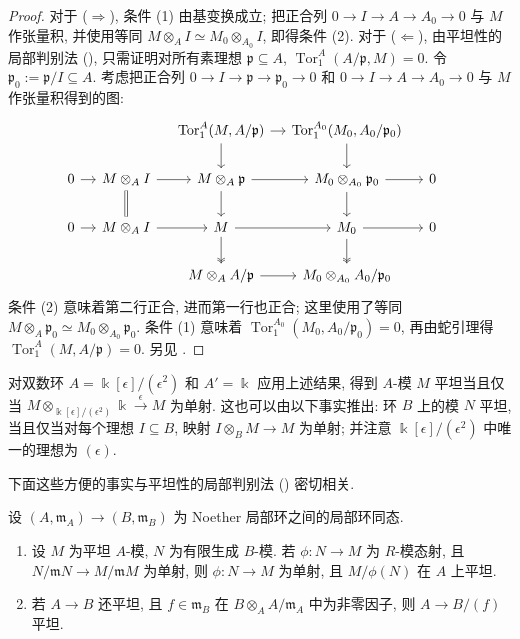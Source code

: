 \begin{proof}
对于 ($\Rightarrow$), 条件 (1) 由基变换成立; 把正合列 $0\to I\to A\to A_0\to0$ 与 $M$ 作张量积, 并使用等同 $M\otimes_A I\simeq M_0\otimes_{A_0}I$, 即得条件 (2). 对于 ($\Leftarrow$), 由平坦性的局部判别法 (), 只需证明对所有素理想 $\mathfrak p\subseteq A$, $\operatorname{Tor}_1^A(A/\mathfrak p,M)=0$. 令 $\mathfrak p_0:=\mathfrak p/I\subseteq A$. 考虑把正合列 $0\to I\to\mathfrak p\to\mathfrak p_0\to0$ 和 $0\to I\to A\to A_0\to0$ 与 $M$ 作张量积得到的图:
\[
\begin{tikzcd}[column sep=1.1em,row sep=1.8em]
&&\operatorname{Tor}_1^A(M,A/\mathfrak p)\arrow[r]\arrow[d]&\operatorname{Tor}_1^{A_0}(M_0,A_0/\mathfrak p_0)\arrow[d]&&\\
0\arrow[r]&M\otimes_A I\arrow[r]\arrow[d,equal]&M\otimes_A\mathfrak p\arrow[r]\arrow[d]&M_0\otimes_{A_0}\mathfrak p_0\arrow[r]\arrow[d]&0\\
0\arrow[r]&M\otimes_A I\arrow[r]&M\arrow[r]\arrow[d,two heads]&M_0\arrow[r]\arrow[d,two heads]&0\\
&&M\otimes_A A/\mathfrak p\arrow[r]&M_0\otimes_{A_0}A_0/\mathfrak p_0
\end{tikzcd}
\]
条件 (2) 意味着第二行正合, 进而第一行也正合; 这里使用了等同 $M\otimes_A\mathfrak p_0\simeq M_0\otimes_{A_0}\mathfrak p_0$. 条件 (1) 意味着 $\operatorname{Tor}_1^{A_0}(M_0,A_0/\mathfrak p_0)=0$, 再由蛇引理得 $\operatorname{Tor}_1^A(M,A/\mathfrak p)=0$. 另见 \cite[命题 $2.2$]{Har10}.
\end{proof}
\begin{remark}\label{src:A.2.7}
对双数环 $A=\Bbbk[\epsilon]/(\epsilon^2)$ 和 $A'=\Bbbk$ 应用上述结果, 得到 $A$-模 $M$ 平坦当且仅当 $M\otimes_{\Bbbk[\epsilon]/(\epsilon^2)}\Bbbk\xrightarrow{\epsilon}M$ 为单射. 这也可以由以下事实推出: 环 $B$ 上的模 $N$ 平坦, 当且仅当对每个理想 $I\subseteq B$, 映射 $I\otimes_B M\to M$ 为单射; 并注意 $\Bbbk[\epsilon]/(\epsilon^2)$ 中唯一的理想为 $(\epsilon)$.
\end{remark}
下面这些方便的事实与平坦性的局部判别法 () 密切相关.
\begin{lemma}\label{src:A.2.8}
设 $(A,\mathfrak m_A)\to(B,\mathfrak m_B)$ 为 Noether 局部环之间的局部环同态.
\begin{enumerate}[(1)]
\item 设 $M$ 为平坦 $A$-模, $N$ 为有限生成 $B$-模. 若 $\phi:N\to M$ 为 $R$-模态射, 且 $N/\mathfrak m N\to M/\mathfrak m M$ 为单射, 则 $\phi:N\to M$ 为单射, 且 $M/\phi(N)$ 在 $A$ 上平坦.
\item 若 $A\to B$ 还平坦, 且 $f\in\mathfrak m_B$ 在 $B\otimes_A A/\mathfrak m_A$ 中为非零因子, 则 $A\to B/(f)$ 平坦.
\end{enumerate}
\end{lemma}
